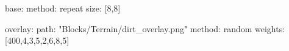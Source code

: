 base:
  method: repeat
  size: [8,8]

overlay:
  path: "Blocks/Terrain/dirt_overlay.png"
  method: random
  weights: [400,4,3,5,2,6,8,5]